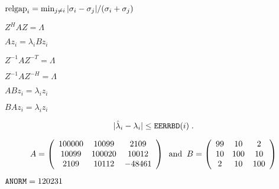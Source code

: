 {\newpage\clearpage
{}%
${\rm relgap}_i = \min_{j \neq i} | \sigma_i - \sigma_j | / ( \sigma_i + \sigma_j )$%
\lthtmlinlinemathZ
\lthtmlcheckvsize\clearpage}

{\newpage\clearpage
{}%
$Z^H A Z = \Lambda$%
\lthtmlinlinemathZ
\lthtmlcheckvsize\clearpage}

{\newpage\clearpage
{}%
$Az_i = \lambda_i B z_i$%
\lthtmlinlinemathZ
\lthtmlcheckvsize\clearpage}

{\newpage\clearpage
{}%
$Z^{-1} A Z^{-T} = \Lambda$%
\lthtmlinlinemathZ
\lthtmlcheckvsize\clearpage}

{\newpage\clearpage
{}%
$Z^{-1} A Z^{-H} = \Lambda$%
\lthtmlinlinemathZ
\lthtmlcheckvsize\clearpage}

{\newpage\clearpage
{}%
$ABz_i = \lambda_i z_i$%
\lthtmlinlinemathZ
\lthtmlcheckvsize\clearpage}

{\newpage\clearpage
{}%
$BAz_i = \lambda_i z_i$%
\lthtmlinlinemathZ
\lthtmlcheckvsize\clearpage}

{\newpage\clearpage
{}%
\begin{displaymath}
| \hat{\lambda}_i - \lambda_i | \leq {\tt EERRBD}(i) \; .
\end{displaymath}%
\lthtmldisplayZ
\lthtmlcheckvsize\clearpage}

{\newpage\clearpage
{}%
\begin{displaymath}
A = \left( \begin{array}{ccc} 100000 & 10099 & 2109 \\10099 & 100020 & 10012 \\
2109 & 10112 & -48461 \end{array} \right) 
\; \; {\rm and} \; \;
B = \left( \begin{array}{ccc} 99 & 10 & 2 \\10 & 100 & 10 \\2 & 10 & 100 \end{array} \right) 
\end{displaymath}%
\lthtmldisplayZ
\lthtmlcheckvsize\clearpage}

{\newpage\clearpage
{}%
${\tt ANORM} = 120231$%
\lthtmlinlinemathZ
\lthtmlcheckvsize\clearpage}

